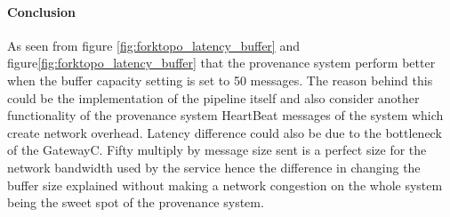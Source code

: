 \paragraph*{Conclusion}
As seen from figure \ref{fig:forktopo_latency_buffer} and figure\ref{fig:forktopo_latency_buffer} that the provenance system perform better when the buffer capacity setting is set to 50 messages. The reason behind this could be the implementation of the pipeline itself and also consider another functionality of the provenance system HeartBeat messages of the system which create network overhead. Latency difference could also be due to the bottleneck of the GatewayC. Fifty multiply by message size sent is a perfect size for the network bandwidth used by the service hence the difference in changing the buffer size explained without making a network congestion on the whole system being the sweet spot of the provenance system.


